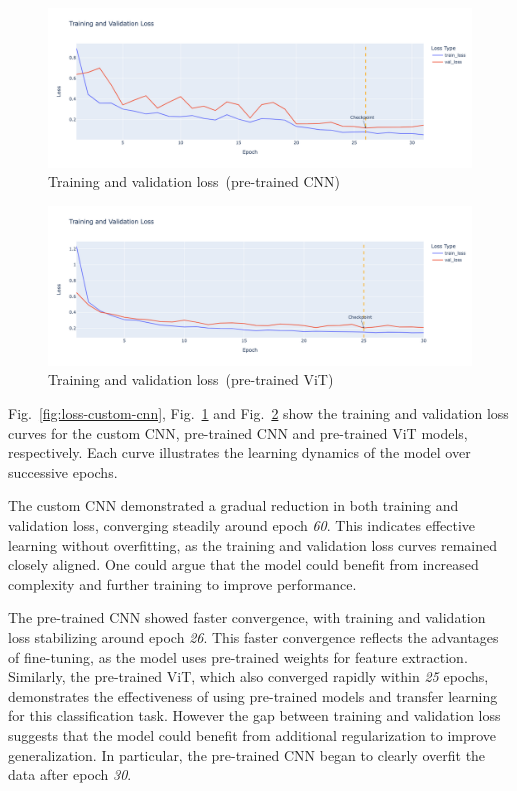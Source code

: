 \begin{figure}[htbp]
    \centerline{\includegraphics[width=0.9\linewidth]{../../resources/resnet/loss.png}}
    \caption{Training and validation loss~(pre-trained CNN)}
    \label{fig:loss-pretrained-cnn}
\end{figure}

\begin{figure}[htbp]
    \centerline{\includegraphics[width=0.9\linewidth]{../../resources/vit/loss.png}}
    \caption{Training and validation loss~(pre-trained ViT)}
    \label{fig:loss-pretrained-vit}
\end{figure}

Fig.~\ref{fig:loss-custom-cnn}, Fig.~\ref{fig:loss-pretrained-cnn} and Fig.~\ref{fig:loss-pretrained-vit} show the training and validation loss curves for the custom CNN, pre-trained CNN and pre-trained ViT models, respectively. Each curve illustrates the learning dynamics of the model over successive epochs.

The custom CNN demonstrated a gradual reduction in both training and validation loss, converging steadily around epoch \textit{60}. This indicates effective learning without overfitting, as the training and validation loss curves remained closely aligned. One could argue that the model could benefit from increased complexity and further training to improve performance.

The pre-trained CNN showed faster convergence, with training and validation loss stabilizing around epoch \textit{26}. This faster convergence reflects the advantages of fine-tuning, as the model uses pre-trained weights for feature extraction. Similarly, the pre-trained ViT, which also converged rapidly within \textit{25} epochs, demonstrates the effectiveness of using pre-trained models and transfer learning for this classification task. However the gap between training and validation loss suggests that the model could benefit from additional regularization to improve generalization. In particular, the pre-trained CNN began to clearly overfit the data after epoch \textit{30}.

